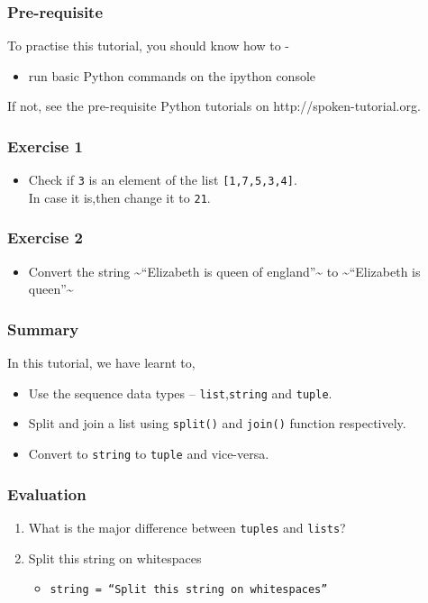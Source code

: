 \documentclass[17pt]{beamer}
\begin{document}
\begin{frame}
\frametitle{Pre-requisite}
\label{sec-3}

  To practise this tutorial, you should know how to  -\pause

\begin{itemize}
\item run basic Python commands on the ipython console
\end{itemize}
If not, see the pre-requisite Python tutorials on {\color{blue}http://spoken-tutorial.org}.
\end{frame}


\begin{frame}
\frametitle{Exercise 1}
\label{sec-11}

\begin{itemize}
\item Check if \texttt{3} is an element of the list \texttt{[1,7,5,3,4]}.\\ In case it is,then
change it to \texttt{21}.
\end{itemize}
\end{frame}
\begin{frame}
\frametitle{Exercise 2}
\label{sec-12}
\begin{itemize}
\item Convert the string \~{}``Elizabeth is queen of england''\~{} to \~{}``Elizabeth is queen''\~{}
\end{itemize}
\end{frame}
\begin{frame}
\frametitle{Summary}
\label{sec-13.1}
In this tutorial, we have learnt to,
\begin{itemize}
\item Use the sequence data types -- \texttt{list},\texttt{string} and \texttt{tuple}.\pause
\item Split and join a list using \texttt{split()} and \texttt{join()} function respectively.\pause
\item Convert to \texttt{string} to \texttt{tuple} and vice-versa.
\end{itemize}
\end{frame}
\begin{frame}
\frametitle{Evaluation}
\label{sec-14}
\begin{enumerate}
\item What is the major difference between \texttt{tuples} and \texttt{lists}?
\vspace{12pt}
\item Split this string on whitespaces
\begin{itemize}
\item \texttt{string = ``Split this string on whitespaces''}
\end{itemize}
\end{enumerate}
\end{frame}
\end{document}

